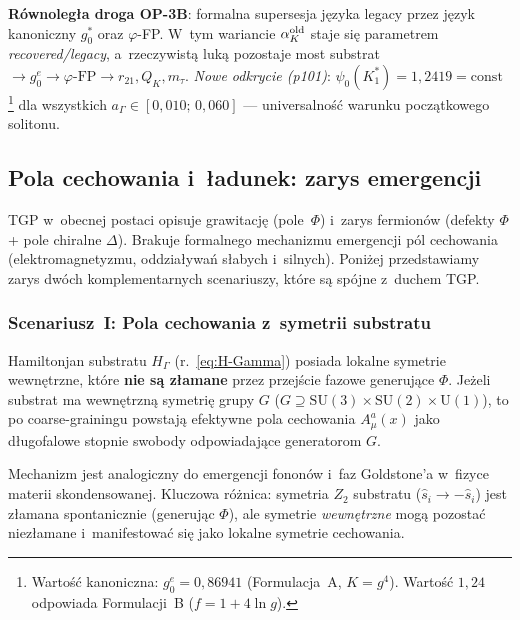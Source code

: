 \begin{problem}
\textbf{R\'ownoleg\l{}a droga OP-3B}: formalna supersesja j\k{e}zyka legacy
przez j\k{e}zyk kanoniczny $g_0^*$ oraz $\varphi$-FP.
W~tym wariancie $\alpha_K^{\rm old}$ staje si\k{e} parametrem
\emph{recovered/legacy}, a~rzeczywist\k{a} luk\k{a} pozostaje most
substrat $\to g_0^e \to \varphi\text{-FP} \to r_{21},Q_K,m_\tau$.
\emph{Nowe odkrycie (p101)}: $\psi_0(K^*_1) = 1{,}2419 = \mathrm{const}$%
\footnote{Warto\'s\'c kanoniczna: $g_0^e = 0{,}86941$ (Formulacja~A, $K = g^4$). Warto\'s\'c $1{,}24$ odpowiada Formulacji~B ($f = 1+4\ln g$).}
dla wszystkich $a_\Gamma\in[0{,}010;\,0{,}060]$ --- universalno\'s\'c warunku pocz\k{a}tkowego solitonu.
\end{problem}

\subsection{Pola cechowania i~\l{}adunek: zarys emergencji}%
\label{ssec:gauge-emergence}

TGP w~obecnej postaci opisuje grawitacj\k{e} (pole~$\Phi$)
i~zarys fermion\'ow (defekty $\Phi$ + pole chiralne $\Delta$).
Brakuje formalnego mechanizmu emergencji p\'ol cechowania
(elektromagnetyzmu, oddzia\l{}ywa\'n s\l{}abych i~silnych).
Poni\.zej przedstawiamy zarys dw\'och komplementarnych
scenariuszy, kt\'ore s\k{a} sp\'ojne z~duchem TGP.

\subsubsection{Scenariusz~I: Pola cechowania z~symetrii substratu}

\begin{hypothesis}%
\label{hyp:gauge-substrate}
Hamiltonjan substratu $H_\Gamma$ (r.~\eqref{eq:H-Gamma})
posiada lokalne symetrie wewn\k{e}trzne, kt\'ore
\textbf{nie s\k{a} z\l{}amane} przez przej\'scie fazowe
generuj\k{a}ce $\Phi$. Je\.zeli substrat ma wewn\k{e}trzn\k{a}
symetri\k{e} grupy $G$ ($G \supseteq \mathrm{SU}(3)\times
\mathrm{SU}(2)\times \mathrm{U}(1)$), to po coarse-grainingu
powstaj\k{a} efektywne pola cechowania $A_\mu^a(x)$
jako d\l{}ugofalowe stopnie swobody odpowiadaj\k{a}ce
generatorom $G$.

Mechanizm jest analogiczny do emergencji fonon\'ow
i~faz Goldstone'a w~fizyce materii skondensowanej.
Kluczowa r\'o\.znica: symetria $Z_2$ substratu ($\hat{s}_i
\to -\hat{s}_i$) jest z\l{}amana spontanicznie (generuj\k{a}c
$\Phi$), ale symetrie \emph{wewn\k{e}trzne}
mog\k{a} pozosta\'c niez\l{}amane i~manifestowa\'c si\k{e}
jako lokalne symetrie cechowania.
\end{hypothesis}

